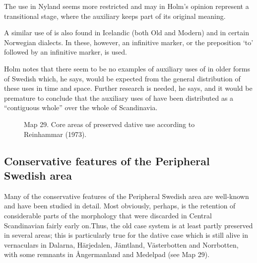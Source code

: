 The use in Nyland seems more restricted and may in Holm’s opinion represent a transitional stage, where the auxiliary keeps part of its original meaning. 

A similar use of  is also found in Icelandic (both Old and Modern) and in certain Norwegian dialects. In these, however, an infinitive marker, or the preposition  ‘to’ followed by an infinitive marker, is used. 

Holm notes that there seem to be no examples of auxiliary uses of  in older forms of Swedish which, he says, would be expected from the general distribution of these uses in time and space. Further research is needed, he says, and it would be premature to conclude that the auxiliary uses of  have been distributed as a “contiguous whole” over the whole of Scandinavia.

\clearpage%


\begin{figure}[h]
\centering
\begin{minipage}{6.53125in}
\label{bkm:Ref134863405}Map 29. Core areas of preserved dative use according to Reinhammar (1973).
\end{minipage}
\end{figure}
\clearpage\subsection[Conservative features of the Peripheral Swedish area]{\rmfamily Conservative features of the Peripheral Swedish area}
Many of the conservative features of the Peripheral Swedish area are well-known and have been studied in detail. Most obviously, perhaps, is the retention of considerable parts of the morphology that were discarded in Central Scandinavian fairly early on.Thus, the old case system is at least partly preserved in several areas; this is particularly true for the dative case which is still alive in vernaculars in Dalarna, Härjedalen, Jämtland, Västerbotten and Norrbotten, with some remnants in Ångermanland and Medelpad (see Map 29). 

